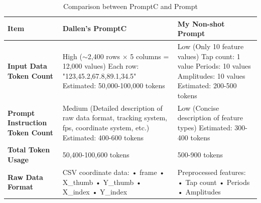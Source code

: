 \documentclass{article}
\begin{document}
\begin{table}[h]
\centering
\small
\begin{tabular}{p{3.5cm}p{5.5cm}p{5.5cm}}
\toprule
\textbf{Item} & \textbf{Dallen's PromptC} & \textbf{My Non-shot Prompt} \\
\midrule
\textbf{Input Data Token Count} & 
High\newline
($\sim$2,400 rows $\times$ 5 columns = 12,000 values)\newline
Each row: "123,45.2,67.8,89.1,34.5"\newline
Estimated: 50,000-100,000 tokens & 
Low\newline
(Only 10 feature values)\newline
Tap count: 1 value\newline
Periods: 10 values\newline
Amplitudes: 10 values\newline
Estimated: 200-500 tokens \\
\midrule
\textbf{Prompt Instruction Token Count} & 
Medium\newline
(Detailed description of raw data format, tracking system, fps, coordinate system, etc.)\newline
Estimated: 400-600 tokens & 
Low\newline
(Concise description of feature types)\newline
Estimated: 300-400 tokens \\
\midrule
\textbf{Total Token Usage} & 
50,400-100,600 tokens & 
500-900 tokens \\
\midrule
\textbf{Raw Data Format} & 
CSV coordinate data:\newline
• frame\newline
• X\_thumb\newline
• Y\_thumb\newline
• X\_index \newline
• Y\_index  & 
Preprocessed features:\newline
• Tap count \newline
• Periods \newline
• Amplitudes \\
\bottomrule
\end{tabular}
\caption{Comparison between PromptC and Prompt}
\label{tab:comparison}
\end{table}
\end{document}
